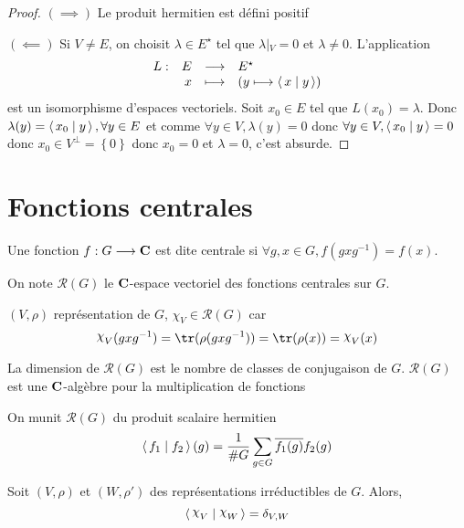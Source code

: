 \begin{proof}
    $(\implies )$ Le produit hermitien est défini positif

    $(\impliedby)$ Si $V\neq E$, on choisit  $ \lambda \in  E^\star$ tel que $ \lambda\left|_{V}\right.=0$ et $\lambda\neq 0 $. L'application \[
    \begin{array}{rrcl}
        L:& E & \longrightarrow & E^\star \\
          & x & \longmapsto & \displaystyle (y \longmapsto \scalar{x}{y} )
    \end{array}
    \] 
    est un isomorphisme d'espaces vectoriels. Soit $x_0 \in  E$ tel que $L(x_0)=\lambda$. Donc  $\lambda(y)= \scalar{x_0}{y} , \forall  y \in  E$ et comme $\forall  y \in  V, \lambda(y)=0$ donc $\forall y \in  V, \scalar{x_0}{y} =0$ donc $x_0 \in  V^\bot = \left\{ 0 \right\} $ donc $x_0=0$ et  $ \lambda=0$, c'est absurde.
\end{proof}

\section{Fonctions centrales}

\begin{dfn}
    Une fonction $f : G \longrightarrow  \mathbf C$ est dite centrale si $\forall  g , x \in  G, f(gxg^{-1})=f(x)$.
\end{dfn}

\begin{rem}[Notation]
    On note $\mathcal  R(G)$ le  $ \mathbf C$-espace vectoriel des fonctions centrales sur $G$.
\end{rem}


\begin{ex}
    $(V, \rho)$ représentation de  $G$,  $\chi_V \in  \mathcal  R(G)$ car \[
        \chi_V(gxg^{-1})=\tr(\rho(gxg^{-1}))=\tr(\rho(x))=\chi_V(x)
    \]
\end{ex}

\begin{rem}
    La dimension de $\mathcal  R(G)$ est le nombre de classes de conjugaison de $G$.  $\mathcal  R(G)$ est une $ \mathbf C$-algèbre pour la multiplication de fonctions
\end{rem}

On munit $\mathcal  R(G)$ du produit scalaire hermitien \[
    \scalar{f_1}{f_2}(g) =\frac1{\#G}\sum_{g \in  G} \bar{f_1(g)}f_2(g)
\] 

\begin{prop}
    Soit $(V, \rho)$ et  $(W, \rho')$ des représentations irréductibles de  $G$. Alors,  \[
        \scalar{\chi_V}{\chi_W} = \delta_{V,W}
    \] 
\end{prop}

